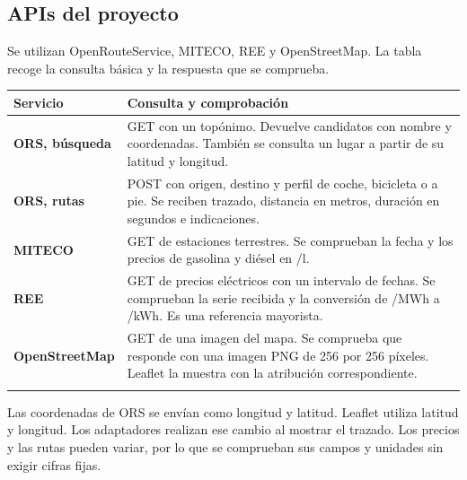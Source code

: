 \documentclass[11pt,a4paper]{article}
\begin{document}
\subsection*{APIs del proyecto}
Se utilizan OpenRouteService, MITECO, REE y OpenStreetMap. La tabla recoge la consulta básica y la respuesta que se comprueba.\par
\begingroup\fontsize{9.25}{11.7}\selectfont\begin{tabularx}{\linewidth}{@{}p{3.2cm}Y@{}}\toprule
\textbf{Servicio} & \textbf{Consulta y comprobación}\\[2pt]\midrule
\textbf{ORS, búsqueda} & GET con un topónimo. Devuelve candidatos con nombre y coordenadas. También se consulta un lugar a partir de su latitud y longitud.\\[2pt]\midrule[0.25pt]
\textbf{ORS, rutas} & POST con origen, destino y perfil de coche, bicicleta o a pie. Se reciben trazado, distancia en metros, duración en segundos e indicaciones.\\[2pt]\midrule[0.25pt]
\textbf{MITECO} & GET de estaciones terrestres. Se comprueban la fecha y los precios de gasolina y diésel en \texteuro{}/l.\\[2pt]\midrule[0.25pt]
\textbf{REE} & GET de precios eléctricos con un intervalo de fechas. Se comprueban la serie recibida y la conversión de \texteuro{}/MWh a \texteuro{}/kWh. Es una referencia mayorista.\\[2pt]\midrule[0.25pt]
\textbf{OpenStreetMap} & GET de una imagen del mapa. Se comprueba que responde con una imagen PNG de 256 por 256 píxeles. Leaflet la muestra con la atribución correspondiente.\\[2pt]\midrule[0.25pt]
\end{tabularx}\endgroup\par
Las coordenadas de ORS se envían como longitud y latitud. Leaflet utiliza latitud y longitud. Los adaptadores realizan ese cambio al mostrar el trazado. Los precios y las rutas pueden variar, por lo que se comprueban sus campos y unidades sin exigir cifras fijas.\par
\end{document}
